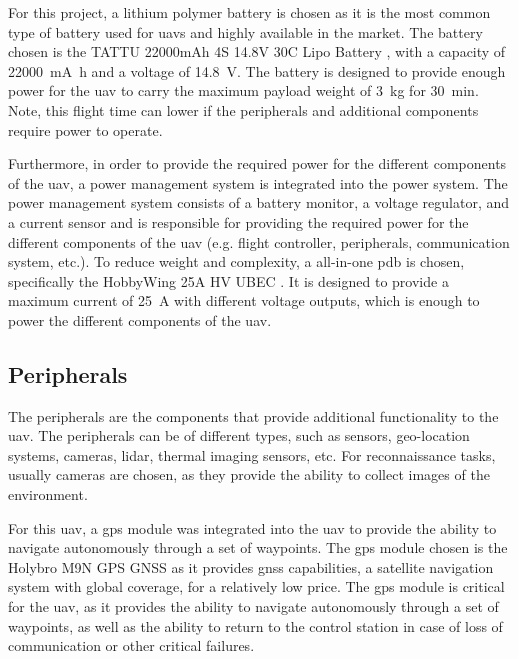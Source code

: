 For this project, a lithium polymer battery is chosen as it is the most common type of battery used for \glspl{uav} and highly available in the market. The battery chosen is the TATTU 22000mAh 4S 14.8V 30C Lipo Battery \autocite{rcinnovationsComprarBatera}, with a capacity of \SI{22000}{\milli\ampere\hour} and a voltage of \SI{14.8}{\volt}. The battery is designed to provide enough power for the \gls{uav} to carry the maximum payload weight of \SI{3}{\kilo\gram} for \SI{30}{\minute}. Note, this flight time can lower if the peripherals and additional components require power to operate.

Furthermore, in order to provide the required power for the different components of the \gls{uav}, a power management system is integrated into the power system. The power management system consists of a battery monitor, a voltage regulator, and a current sensor and is responsible for providing the required power for the different components of the \gls{uav} (e.g. flight controller, peripherals, communication system, etc.). To reduce weight and complexity, a all-in-one \gls{pdb} is chosen, specifically the HobbyWing 25A HV UBEC \autocite{rcinnovationsHobbyWingUbec}. It is designed to provide a maximum current of \SI{25}{\ampere} with different voltage outputs, which is enough to power the different components of the \gls{uav}.

\subsection{Peripherals}

The peripherals are the components that provide additional functionality to the \gls{uav}. The peripherals can be of different types, such as sensors, geo-location systems, cameras, lidar, thermal imaging sensors, etc. For reconnaissance tasks, usually cameras are chosen, as they provide the ability to collect images of the environment.

For this \gls{uav}, a \gls{gps} module was integrated into the \gls{uav} to provide the ability to navigate autonomously through a set of waypoints. The \gls{gps} module chosen is the Holybro M9N GPS GNSS \autocite{rcinnovationsHolybroGNSS} as it provides \gls{gnss} capabilities, a satellite navigation system with global coverage, for a relatively low price. The \gls{gps} module is critical for the \gls{uav}, as it provides the ability to navigate autonomously through a set of waypoints, as well as the ability to return to the control station in case of loss of communication or other critical failures.

